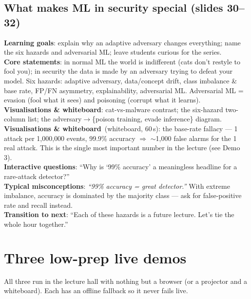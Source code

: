 \documentclass[11pt,a4paper]{article}
\newcommand{\obj}{\textbf{\color{accent}Learning goals}}
\newcommand{\core}{\textbf{\color{accent}Core statements}}
\newcommand{\viz}{\textbf{\color{accent}Visualisations \& whiteboard}}
\newcommand{\ask}{\textbf{\color{accent}Interactive questions}}
\newcommand{\misc}{\textbf{\color{bad}Typical misconceptions}}
\newcommand{\trans}{\textbf{\color{mlsig}Transition to next}}
\begin{document}
\subsection{What makes ML in security special (slides 30--32)}
\obj: explain why an adaptive adversary changes everything; name the six hazards
and adversarial ML; leave students curious for the series.\\
\core: in normal ML the world is indifferent (cats don't restyle to fool you); in
security the data is made by an adversary trying to defeat your model. Six
hazards: adaptive adversary, data/concept drift, class imbalance \& base rate,
FP/FN asymmetry, explainability, adversarial ML. Adversarial ML = evasion (fool
what it sees) and poisoning (corrupt what it learns).\\
\viz: cat-vs-malware contrast; the six-hazard two-column list; the
adversary$\to$\{poison training, evade inference\} diagram.\\
\viz\ (whiteboard, 60\,s): the base-rate fallacy --- 1 attack per 1{,}000{,}000
events, 99.9\% accuracy $\Rightarrow$ $\sim$1{,}000 false alarms for the 1 real
attack. This is the single most important number in the lecture (see Demo 3).\\
\ask: ``Why is `99\% accuracy' a meaningless headline for a rare-attack
detector?''\\
\misc: \emph{``99\% accuracy = great detector.''} With extreme imbalance,
accuracy is dominated by the majority class --- ask for false-positive rate and
recall instead.\\
\trans: ``Each of these hazards is a future lecture. Let's tie the whole hour
together.''

\section{Three low-prep live demos}

All three run in the lecture hall with nothing but a browser (or a projector and
a whiteboard). Each has an offline fallback so it never fails live.
\end{document}

